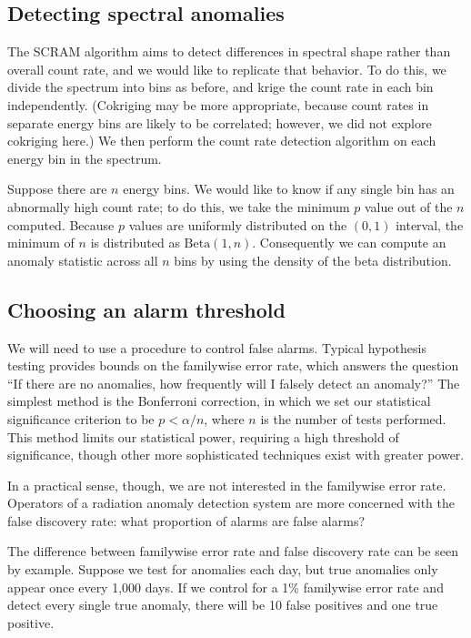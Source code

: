 \subsection{Detecting spectral anomalies}\label{spectral-anomaly}

The SCRAM algorithm aims to detect differences in spectral shape rather than
overall count rate, and we would like to replicate that behavior. To do this, we
divide the spectrum into bins as before, and krige the count rate in each bin
independently. (Cokriging may be more appropriate, because count rates in
separate energy bins are likely to be correlated; however, we did not explore
cokriging here.)  We then perform the count rate detection algorithm on each
energy bin in the spectrum.

Suppose there are \(n\) energy bins. We would like to know if any single bin has
an abnormally high count rate; to do this, we take the minimum \(p\) value out
of the \(n\) computed. Because \(p\) values are uniformly distributed on the
\((0,1)\) interval, the minimum of \(n\) is distributed as
\(\text{Beta}(1,n)\).\cite{David} Consequently we can compute an anomaly
statistic across all \(n\) bins by using the density of the beta distribution.

\subsection{Choosing an alarm threshold}

We will need to use a procedure to control false alarms. Typical hypothesis
testing provides bounds on the familywise error rate, which answers the question
``If there are no anomalies, how frequently will I falsely detect an anomaly?''
The simplest method is the Bonferroni correction, in which we set our
statistical significance criterion to be \(p < \alpha/n\), where \(n\) is the
number of tests performed. This method limits our statistical power, requiring a
high threshold of significance, though other more sophisticated techniques exist
with greater power.\cite{Holm:1979ws}

In a practical sense, though, we are not interested in the familywise error
rate. Operators of a radiation anomaly detection system are more concerned with
the false discovery rate: what proportion of alarms are false alarms?

The difference between familywise error rate and false discovery rate can be
seen by example. Suppose we test for anomalies each day, but true anomalies only
appear once every 1,000 days. If we control for a 1\% familywise error rate and
detect every single true anomaly, there will be 10 false positives and one true
positive.

